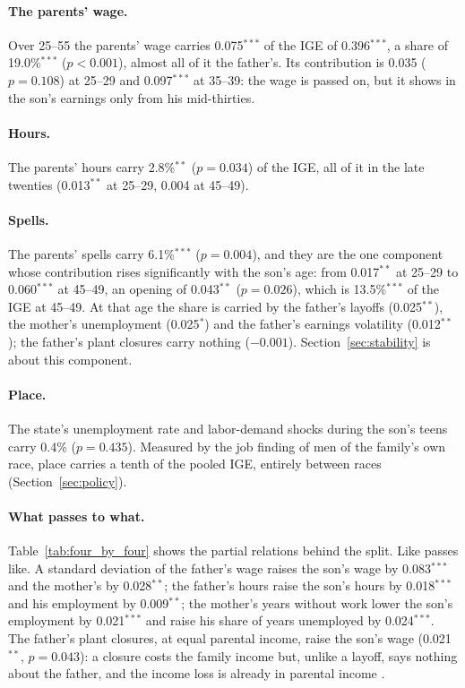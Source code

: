 

\paragraph{The parents' wage.} Over 25--55 the parents' wage carries 0.075$^{***}$ of the IGE of 0.396$^{***}$, a share
of 19.0\%$^{***}$ ($p<0.001$), almost all of it the father's. Its contribution is 0.035 ($p = 0.108$) at 25--29 and
0.097$^{***}$ at 35--39: the wage is passed on, but it shows in the son's earnings only from his mid-thirties.

\paragraph{Hours.} The parents' hours carry 2.8\%$^{**}$ ($p = 0.034$) of the IGE, all of it in the late twenties
(0.013$^{**}$ at 25--29, 0.004 at 45--49).

\paragraph{Spells.} The parents' spells carry 6.1\%$^{***}$ ($p = 0.004$), and they are the one component whose
contribution rises significantly with the son's age: from 0.017$^{**}$ at 25--29 to 0.060$^{***}$ at 45--49, an opening of
0.043$^{**}$ ($p = 0.026$), which is 13.5\%$^{***}$ of the IGE at 45--49. At that age the share is carried by the father's
layoffs (0.025$^{**}$), the mother's unemployment (0.025$^{*}$) and the father's earnings volatility (0.012$^{**}$); the
father's plant closures carry nothing ($-0.001$). Section~\ref{sec:stability} is about this component.

\paragraph{Place.} The state's unemployment rate and labor-demand shocks during the son's teens carry 0.4\% ($p = 0.435$).
Measured by the job finding of men of the family's own race, place carries a tenth of the pooled IGE, entirely between
races (Section~\ref{sec:policy}).

\paragraph{What passes to what.} Table~\ref{tab:four_by_four} shows the partial relations behind the split. Like passes
like. A standard deviation of the father's wage raises the son's wage by 0.083$^{***}$ and the mother's by
0.028$^{**}$; the father's hours raise the son's hours by 0.018$^{***}$ and his employment by 0.009$^{**}$; the mother's
years without work lower the son's employment by 0.021$^{***}$ and raise his share of years unemployed by 0.024$^{***}$.
The father's plant closures, at equal parental income, raise the son's wage (0.021$^{**}$, $p = 0.043$): a closure costs
the family income but, unlike a layoff, says nothing about the father, and the income loss is already in parental
income \citep{gibbons1991layoffs}.

